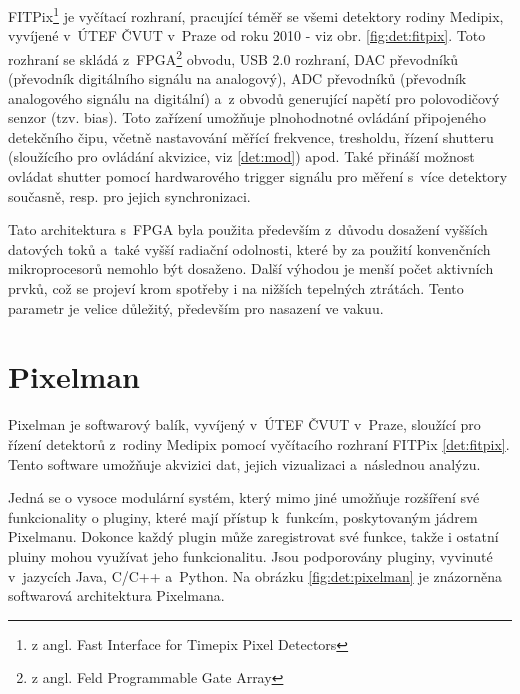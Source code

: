 FITPix\footnote{z angl. Fast Interface for Timepix Pixel Detectors} \cite{fitpix} je vyčítací rozhraní, pracující téměř se všemi detektory rodiny Medipix, vyvíjené v~ÚTEF ČVUT v~Praze od roku 2010 - viz obr. \ref{fig:det:fitpix}. Toto rozhraní se skládá z~FPGA\footnote{z angl. Feld Programmable Gate Array} obvodu, USB 2.0 rozhraní, DAC převodníků (převodník digitálního signálu na analogový), ADC převodníků (převodník analogového signálu na digitální) a~z obvodů generující napětí pro polovodičový senzor (tzv. bias). Toto zařízení umožňuje plnohodnotné ovládání připojeného detekčního čipu, včetně nastavování měřící frekvence, tresholdu, řízení shutteru (sloužícího pro ovládání akvizice, viz \ref{det:mod}) apod. Také přináší možnost ovládat shutter pomocí hardwarového trigger signálu pro měření s~více detektory současně, resp. pro jejich synchronizaci.

Tato architektura s~FPGA byla použita především z~důvodu dosažení vyšších datových toků a~také vyšší radiační odolnosti, které by za použití konvenčních mikroprocesorů nemohlo být dosaženo. Další výhodou je menší počet aktivních prvků, což se projeví krom spotřeby i na nižších tepelných ztrátách. Tento parametr je velice důležitý, především pro nasazení ve vakuu.

\section{Pixelman}\label{det:pixelman}
Pixelman \cite{pixelman} je softwarový balík, vyvíjený v~ÚTEF ČVUT v~Praze, sloužící pro řízení detektorů z~rodiny Medipix pomocí vyčítacího rozhraní FITPix \ref{det:fitpix}. Tento software umožňuje akvizici dat, jejich vizualizaci a~následnou analýzu.

Jedná se o vysoce modulární systém, který mimo jiné umožňuje rozšíření své funkcionality o pluginy, které mají přístup k~funkcím, poskytovaným jádrem Pixelmanu. Dokonce každý plugin může zaregistrovat své funkce, takže i ostatní pluiny mohou využívat jeho funkcionalitu. Jsou podporovány pluginy, vyvinuté v~jazycích Java, C/C++ a~Python. Na obrázku \ref{fig:det:pixelman} je znázorněna softwarová architektura Pixelmana.


